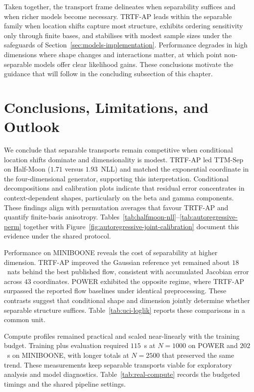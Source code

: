 \documentclass[11pt,a4paper,twoside]{book}\usepackage[]{graphicx}\usepackage[]{xcolor}
\begin{document}
Taken together, the transport frame delineates when separability suffices and when richer models become necessary. TRTF-AP leads within the separable family when location shifts capture most structure, exhibits ordering sensitivity only through finite bases, and stabilises with modest sample sizes under the safeguards of Section~\ref{sec:models-implementation}. Performance degrades in high dimensions where shape changes and interactions matter, at which point non-separable models offer clear likelihood gains. These conclusions motivate the guidance that will follow in the concluding subsection of this chapter.

\section{Conclusions, Limitations, and Outlook}\label{sec:conclusion-outlook}
We conclude that separable transports remain competitive when conditional location shifts dominate and dimensionality is modest. TRTF-AP led TTM-Sep on Half-Moon ($1.71$ versus $1.93$~NLL) and matched the exponential coordinate in the four-dimensional generator, supporting this interpretation. Conditional decompositions and calibration plots indicate that residual error concentrates in context-dependent shapes, particularly on the beta and gamma components. These findings align with permutation averages that favour TRTF-AP and quantify finite-basis anisotropy. Tables~\ref{tab:halfmoon-nll}--\ref{tab:autoregressive-perm} together with Figure~\ref{fig:autoregressive-joint-calibration} document this evidence under the shared protocol.

Performance on MINIBOONE reveals the cost of separability at higher dimension. TRTF-AP improved the Gaussian reference yet remained about $18$~nats behind the best published flow, consistent with accumulated Jacobian error across $43$ coordinates. POWER exhibited the opposite regime, where TRTF-AP surpassed the reported flow baselines under identical preprocessing. These contrasts suggest that conditional shape and dimension jointly determine whether separable structure suffices. Table~\ref{tab:uci-loglik} reports these comparisons in a common unit.

Compute profiles remained practical and scaled near-linearly with the training budget. Training plus evaluation required $115$~s at $N=1000$ on POWER and $202$~s on MINIBOONE, with longer totals at $N=2500$ that preserved the same trend. These measurements keep separable transports viable for exploratory analysis and model diagnostics. Table~\ref{tab:real-compute} records the budgeted timings and the shared pipeline settings.
\end{document}
